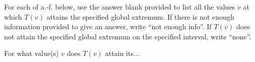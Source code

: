 \documentclass[11pt]{exam}
\begin{document}
\begin{questions}
  For each of a.-f. below, use the answer blank provided to list all the values \(v\) at which \(T(v)\) attains the specified global extremum. If there is not enough information provided to give an answer, write “not enough info”. If \(T(v)\) does not attain the specified global extremum on the specified interval, write “none”.

  For what value(s) \(v\) does \(T(v)\) attain its... 
\end{questions}
\end{document}
